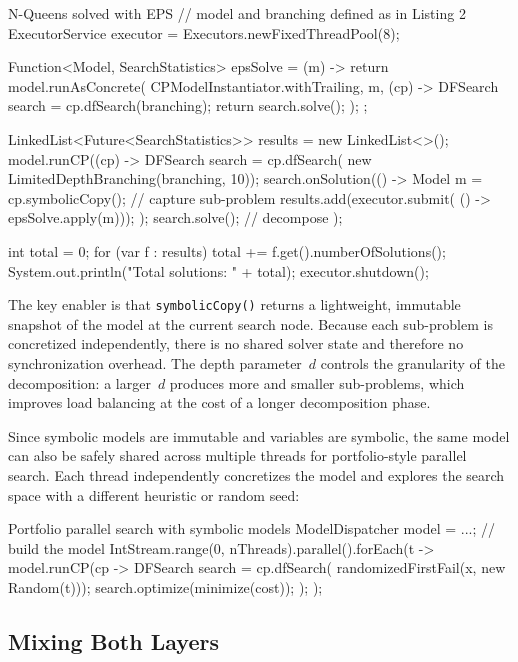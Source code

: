 \documentclass[11pt, a4paper]{scrartcl}
\begin{document}
\begin{codebox}[label={lst:nqueens-eps}]{N-Queens solved with EPS}
// model and branching defined as in Listing 2
ExecutorService executor = Executors.newFixedThreadPool(8);

Function<Model, SearchStatistics> epsSolve = (m) -> {
    return model.runAsConcrete(
        CPModelInstantiator.withTrailing, m, (cp) -> {
        DFSearch search = cp.dfSearch(branching);
        return search.solve();
    });
};

LinkedList<Future<SearchStatistics>> results = new LinkedList<>();
model.runCP((cp) -> {
    DFSearch search = cp.dfSearch(
        new LimitedDepthBranching(branching, 10));
    search.onSolution(() -> {
        Model m = cp.symbolicCopy(); // capture sub-problem
        results.add(executor.submit(
            () -> epsSolve.apply(m)));
    });
    search.solve(); // decompose
});

int total = 0;
for (var f : results)
    total += f.get().numberOfSolutions();
System.out.println("Total solutions: " + total);
executor.shutdown();
\end{codebox}

The key enabler is that \texttt{symbolicCopy()} returns a lightweight, immutable snapshot of the model at the current search node.
Because each sub-problem is concretized independently, there is no shared solver state and therefore no synchronization overhead.
The depth parameter~$d$ controls the granularity of the decomposition: a larger~$d$ produces more and smaller sub-problems, which improves load balancing at the cost of a longer decomposition phase.

Since symbolic models are immutable and variables are symbolic, the same model can also be safely shared across multiple threads for portfolio-style parallel search. Each thread independently concretizes the model and explores the search space with a different heuristic or random seed:

\begin{codebox}{Portfolio parallel search with symbolic models}
ModelDispatcher model = ...; // build the model
IntStream.range(0, nThreads).parallel().forEach(t -> {
    model.runCP(cp -> {
        DFSearch search = cp.dfSearch(
            randomizedFirstFail(x, new Random(t)));
        search.optimize(minimize(cost));
    });
});
\end{codebox}


\subsection{Mixing Both Layers}
\end{document}
